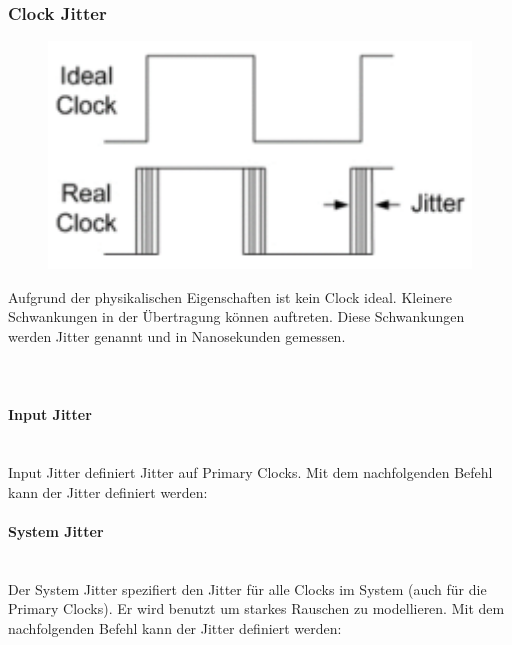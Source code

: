 \subsubsection{Clock Jitter}
\begin{minipage}{0.3\textwidth}
    \begin{figure}[H]
        \includegraphics[width=1\textwidth]{images/clock_jitter.png}
    \end{figure}
\end{minipage}
\hfill
\begin{minipage}{0.65\textwidth}
    Aufgrund der physikalischen Eigenschaften ist kein Clock ideal. Kleinere Schwankungen in der Übertragung können auftreten. Diese Schwankungen werden Jitter genannt und in Nanosekunden gemessen. \ \\ \ \\ \ \\
\end{minipage}

\paragraph{Input Jitter}$~$ \\
Input Jitter definiert Jitter auf Primary Clocks. Mit dem nachfolgenden Befehl kann der Jitter definiert werden:


\paragraph{System Jitter}$~$ \\
Der System Jitter spezifiert den Jitter für alle Clocks im System (auch für die Primary Clocks). Er wird benutzt um starkes Rauschen zu modellieren. Mit dem nachfolgenden Befehl kann der Jitter definiert werden:



